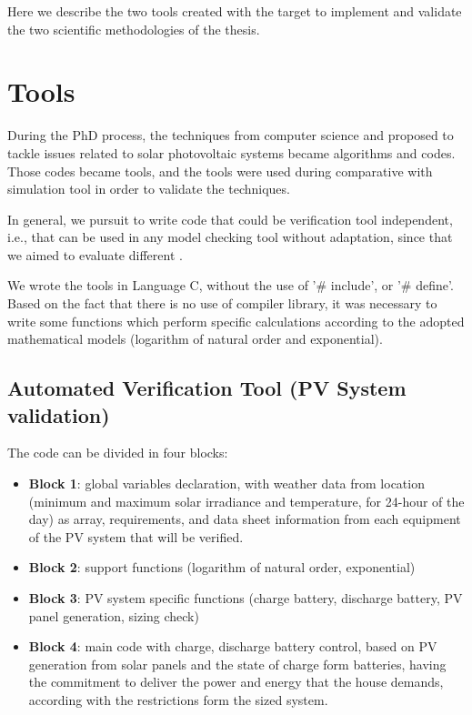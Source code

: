 Here we describe the two tools created with the target to implement and validate the two scientific methodologies of the thesis.

\section{Tools}

During the PhD process, the techniques from computer science and proposed to tackle issues related to solar photovoltaic systems became algorithms and codes. Those codes became tools, and the tools were used during comparative with simulation tool in order to validate the techniques.

In general, we pursuit to write code that could be verification tool independent, i.e., that can be used in any model checking tool without adaptation, since that we aimed to evaluate different .

We wrote the tools in Language C, without the use of '\# include', or '\# define'. Based on the fact that there is no use of compiler library, it was necessary to write some functions which perform specific calculations according to the adopted mathematical models (logarithm of natural order and exponential).

\subsection{Automated Verification Tool (PV System validation)}
\label{sec:automatedverification}

The code can be divided in four blocks:

\begin{itemize}
\item \textbf{Block 1}: global variables declaration, with weather data from location (minimum and maximum solar irradiance and temperature, for 24-hour of the day) as array, requirements, and data sheet information from each equipment of the PV system that will be verified. 

\item \textbf{Block 2}: support functions (logarithm of natural order, exponential)

\item \textbf{Block 3}: PV system specific functions (charge battery, discharge battery, PV panel generation, sizing check)

\item \textbf{Block 4}: main code with charge, discharge battery control, based on PV generation from solar panels and the state of charge form batteries, having the commitment to deliver the power and energy that the house demands, according with the restrictions form the sized system.
\end{itemize}

